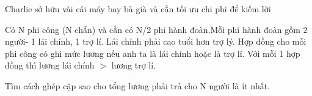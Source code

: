Charlie sở hữu vài cái máy bay bà già và cần tối ưu chi phi để kiếm lời  

   Có N phi công (N chẵn) và cần có N/2 phi hành đoàn.Mỗi phi hành đoàn gồm 2 người- 1 lái chính, 1 trợ lí. Lái chính phải cao tuổi hơn trợ lý. Hợp đồng cho mỗi phi công có ghi mức lương nếu anh ta là lái chính hoặc là trợ lí.  Với mỗi 1 hợp đồng thì lương lái chính $>$ lương trợ lí.  

   Tìm cách ghép cặp sao cho tổng lương phải trả cho N người là ít nhất.  



\